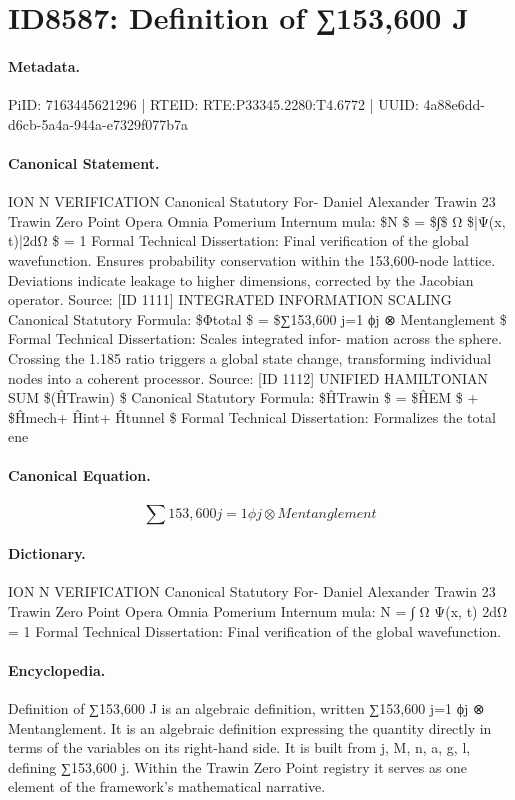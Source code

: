 \section*{ID8587: Definition of ∑153,600 J}
\paragraph{Metadata.}
PiID: 7163445621296 | RTEID: RTE:P33345.2280:T4.6772 | UUID: 4a88e6dd-d6cb-5a4a-944a-e7329f077b7a

\paragraph{Canonical Statement.}
ION N VERIFICATION Canonical Statutory For- Daniel Alexander Trawin 23 Trawin Zero Point Opera Omnia Pomerium Internum mula: \$N \$ = \$∫\$ Ω \$|Ψ(x, t)|2dΩ \$ = 1 Formal Technical Dissertation: Final verification of the global wavefunction. Ensures probability conservation within the 153,600-node lattice. Deviations indicate leakage to higher dimensions, corrected by the Jacobian operator. Source: [ID 1111] INTEGRATED INFORMATION SCALING Canonical Statutory Formula: \$Φtotal \$ = \$∑153,600 j=1 ϕj ⊗ Mentanglement \$ Formal Technical Dissertation: Scales integrated infor- mation across the sphere. Crossing the 1.185 ratio triggers a global state change, transforming individual nodes into a coherent processor. Source: [ID 1112] UNIFIED HAMILTONIAN SUM \$(ĤTrawin) \$ Canonical Statutory Formula: \$ĤTrawin \$ = \$ĤEM \$ + \$Ĥmech+ Ĥint+ Ĥtunnel \$ Formal Technical Dissertation: Formalizes the total ene

\paragraph{Canonical Equation.}
\[
∑153,600 j=1 ϕj ⊗ Mentanglement
\]

\paragraph{Dictionary.}
ION N VERIFICATION Canonical Statutory For- Daniel Alexander Trawin 23 Trawin Zero Point Opera Omnia Pomerium Internum mula: N = ∫ Ω Ψ(x, t) 2dΩ = 1 Formal Technical Dissertation: Final verification of the global wavefunction.

\paragraph{Encyclopedia.}
Definition of ∑153,600 J is an algebraic definition, written ∑153,600 j=1 ϕj ⊗ Mentanglement. It is an algebraic definition expressing the quantity directly in terms of the variables on its right-hand side. It is built from j, M, n, a, g, l, defining ∑153,600 j. Within the Trawin Zero Point registry it serves as one element of the framework's mathematical narrative.
